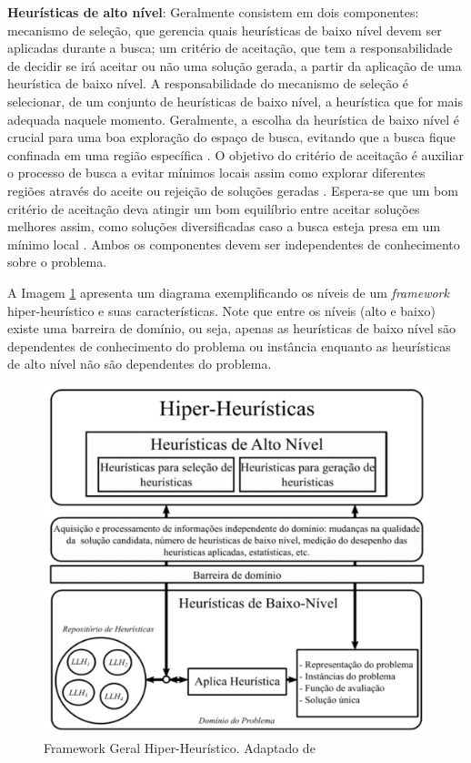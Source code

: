 \textbf{Heurísticas de alto nível}: Geralmente consistem em dois componentes: mecanismo de seleção, que gerencia quais heurísticas de baixo nível devem ser aplicadas durante a busca; um critério de aceitação, que tem a responsabilidade de decidir se irá aceitar ou não uma solução gerada, a partir da aplicação de uma heurística de baixo nível. A responsabilidade do mecanismo de seleção é selecionar, de um conjunto de heurísticas de baixo nível, a heurística que for mais adequada naquele momento. Geralmente, a escolha da heurística de baixo nível é crucial para uma boa exploração do espaço de busca, evitando que a busca fique confinada em uma região específica \cite{sabar2015automatic}. O objetivo do critério de aceitação é auxiliar o processo de busca a evitar mínimos locais assim como explorar diferentes regiões através do aceite ou rejeição de soluções geradas \cite{chakhlevitch2008hyperheuristics}. Espera-se que um bom critério de aceitação deva atingir um bom equilíbrio entre aceitar soluções melhores assim, como soluções diversificadas caso a busca esteja presa em um mínimo local \cite{sabar2015automatic}. Ambos os componentes devem ser independentes de conhecimento sobre o problema.

A Imagem \ref{img:hiperheuristico} apresenta um diagrama exemplificando os níveis de um \textit{framework} hiper-heurístico e suas características. Note que entre os níveis (alto e baixo) existe uma barreira de domínio, ou seja, apenas as heurísticas de baixo nível são dependentes de conhecimento do problema ou instância enquanto as heurísticas de alto nível não são dependentes do problema. 

\begin{figure}[!htb]
	\centering
	\includegraphics{Imagens/HiperHeuristicas.png}
	\caption{Framework Geral Hiper-Heurístico. Adaptado de \cite{sabar2015automatic}}
	\label{img:hiperheuristico}
\end{figure}


